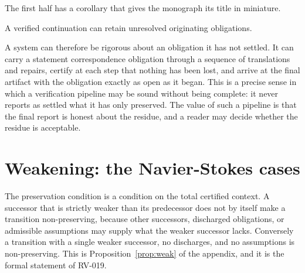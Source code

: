 The first half has a corollary that gives the monograph its title in miniature.

\begin{corollary}[RV-009]
A verified continuation can retain unresolved originating obligations.
\end{corollary}

A system can therefore be rigorous about an obligation it has not settled. It can carry a statement correspondence obligation through a sequence of translations and repairs, certify at each step that nothing has been lost, and arrive at the final artifact with the obligation exactly as open as it began. This is a precise sense in which a verification pipeline may be sound without being complete: it never reports as settled what it has only preserved. The value of such a pipeline is that the final report is honest about the residue, and a reader may decide whether the residue is acceptable.

\section{Weakening: the Navier-Stokes cases}
\label{sec:weakening17}

The preservation condition is a condition on the total certified context. A successor that is strictly weaker than its predecessor does not by itself make a transition non-preserving, because other successors, discharged obligations, or admissible assumptions may supply what the weaker successor lacks. Conversely a transition with a single weaker successor, no discharges, and no assumptions is non-preserving. This is Proposition~\ref{prop:weak} of the appendix, and it is the formal statement of RV-019.


